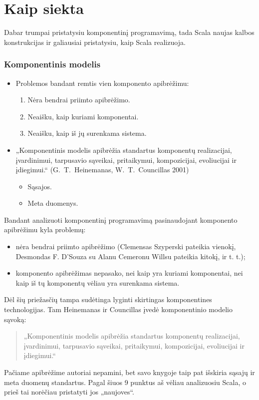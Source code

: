 \section{Kaip siekta}

\begin{handout}
  Dabar trumpai pristatysiu komponentinį programavimą, tada Scala
  naujas kalbos konstrukcijas ir galiausiai pristatysiu, kaip
  Scala realizuoja.
\end{handout}

\begin{frame}
  \frametitle{Komponentinis modelis}
  \begin{itemize}
    \item Problemos bandant remtis vien komponento apibrėžimu:
      \begin{enumerate}
        \item Nėra bendrai priimto apibrėžimo.
        \item Neaišku, kaip kuriami komponentai.
        \item Neaišku, kaip iš jų surenkama sistema.
      \end{enumerate}
    \item „Komponentinis modelis apibrėžia standartus komponentų
      realizacijai, įvardinimui, tarpusavio sąveikai, pritaikymui,
      kompozicijai, evoliucijai ir įdiegimui.“ (\mbox{G. T. Heinemanas},
      \mbox{W. T. Councillas} 2001)
      \begin{itemize}
        \item Sąsajos.
        \item Meta duomenys.
      \end{itemize}
  \end{itemize}
  \begin{handout}
    Bandant analizuoti komponentinį programavimą pasinaudojant komponento
    apibrėžimu kyla problemų:
    \begin{itemize}
      \item nėra bendrai priimto apibrėžimo (Clemensas Szyperski
        pateikia vienokį, Desmondas F. D'Souza su Alanu Cemeronu
        Willsu pateikia kitokį, ir t. t.);
      \item komponento apibrėžimas nepasako, nei kaip yra kuriami
        komponentai, nei kaip iš tų komponentų vėliau yra surenkama
        sistema.
    \end{itemize}
    Dėl šių priežasčių tampa sudėtinga lyginti skirtingas
    komponentines technologijas. Tam Heinemanas ir Councillas įvedė
    komponentinio modelio sąvoką:
    \begin{quote}
      „Komponentinis modelis apibrėžia standartus komponentų
      realizacijai, įvardinimui, tarpusavio sąveikai, pritaikymui,
      kompozicijai, evoliucijai ir įdiegimui.“
    \end{quote}
    Pačiame apibrėžime autoriai nepamini, bet savo knygoje taip pat
    išskiria sąsajų ir meta duomenų standartus. Pagal šiuos 9
    punktus aš vėliau analizuosiu Scala, o prieš tai norėčiau
    pristatyti jos „naujoves“.


\end{handout}
\end{frame}
